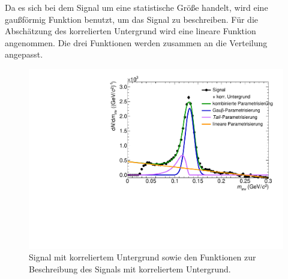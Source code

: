 Da es sich bei dem Signal um eine statistische Größe handelt, wird eine gaußförmig Funktion benutzt, um das Signal zu beschreiben.
\newline
\newline
Für die Abschätzung des korrelierten Untergrund wird eine lineare Funktion angenommen.
\newline
Die drei Funktionen werden zusammen an die Verteilung angepasst.
\begin{figure}[tp]
\centering
\includegraphics[width=.75\linewidth]{StandardParam.pdf}
\caption{Signal mit korreliertem Untergrund sowie den Funktionen zur Beschreibung des Signals mit korreliertem Untergrund.}
\label{figStandardParam}
\end{figure}
